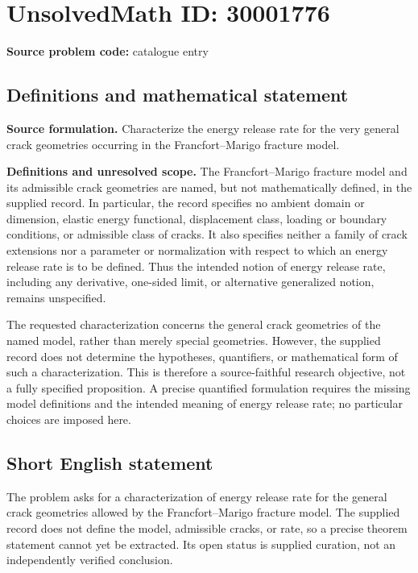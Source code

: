 \documentclass[11pt]{article}
\begin{document}
\section*{UnsolvedMath ID: 30001776}
\textbf{Source problem code:} catalogue entry
\subsection{Definitions and mathematical statement}
\textbf{Source formulation.} Characterize the energy release rate for the very general crack geometries occurring in the Francfort--Marigo fracture model.

\textbf{Definitions and unresolved scope.} The Francfort--Marigo fracture model and its admissible crack geometries are named, but not mathematically defined, in the supplied record. In particular, the record specifies no ambient domain or dimension, elastic energy functional, displacement class, loading or boundary conditions, or admissible class of cracks. It also specifies neither a family of crack extensions nor a parameter or normalization with respect to which an energy release rate is to be defined. Thus the intended notion of energy release rate, including any derivative, one-sided limit, or alternative generalized notion, remains unspecified.

The requested characterization concerns the general crack geometries of the named model, rather than merely special geometries. However, the supplied record does not determine the hypotheses, quantifiers, or mathematical form of such a characterization. This is therefore a source-faithful research objective, not a fully specified proposition. A precise quantified formulation requires the missing model definitions and the intended meaning of energy release rate; no particular choices are imposed here.
\subsection{Short English statement}
The problem asks for a characterization of energy release rate for the general crack geometries allowed by the Francfort--Marigo fracture model. The supplied record does not define the model, admissible cracks, or rate, so a precise theorem statement cannot yet be extracted. Its open status is supplied curation, not an independently verified conclusion.
\end{document}
